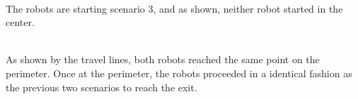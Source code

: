 \documentclass[12pt,letterpaper]{article}
\begin{document}
        
        \begin{center}
             \\
            The robots are starting scenario 3, and as shown, neither robot started in the center.
        \end{center}
%         
%         
%         
        \begin{center}
             \\
            As shown by the travel lines, both robots reached the same point on the perimeter. Once at the perimeter, the robots proceeded in a identical fashion as the previous two scenarios to reach the exit.
        \end{center}
        
\end{document}
